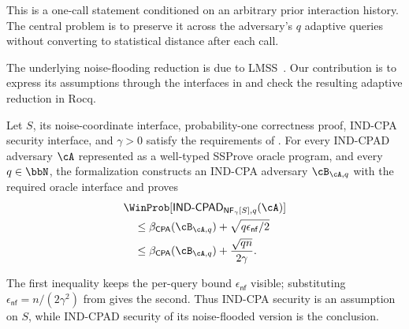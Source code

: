 This is a one-call statement conditioned on an arbitrary prior interaction
history.
The central problem is to preserve it across the adversary's \(q\) adaptive
queries without converting to statistical distance after each call.

The underlying noise-flooding reduction is due to LMSS~\cite{lmss}.
Our contribution is to express its assumptions through the interfaces in
 and check the resulting adaptive reduction in Rocq.

\begin{theorem}
\label{thm:main}
Let \(S\), its noise-coordinate interface, probability-one correctness proof,
IND-CPA security interface, and \(\gamma>0\) satisfy
the requirements of .
For every IND-CPAD adversary \(\cA\) represented as a well-typed SSProve oracle
program, and every \(q\in\bbN\), the formalization constructs an IND-CPA adversary
\(\cB_{\cA,q}\) with the required oracle interface and proves
\begin{align*}
 &\WinProb[
   \mathsf{IND\text{-}CPAD}_{\mathsf{NF}_{\gamma}[S],q}(\cA)]\\
 &\quad\leq \beta_{\mathsf{CPA}}(\cB_{\cA,q})
       +\sqrt{q\epsilon_{\mathsf{nf}}/2}\\
 &\quad\leq \beta_{\mathsf{CPA}}(\cB_{\cA,q})
       +\frac{\sqrt{qn}}{2\gamma}.
\end{align*}
\end{theorem}

The first inequality keeps the per-query bound
\(\epsilon_{\mathsf{nf}}\) visible; substituting
\(\epsilon_{\mathsf{nf}}=n/(2\gamma^2)\) from  gives the
second.
Thus IND-CPA security is an assumption on \(S\), while IND-CPAD security of its
noise-flooded version is the conclusion.

\FloatBarrier

